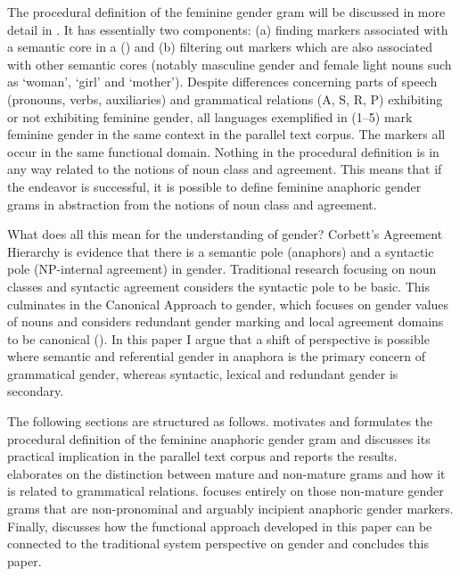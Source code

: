 \documentclass[output=collectionpaper]{langsci/langscibook}
\begin{document}
The procedural definition of the feminine gender gram will be discussed in more detail in . It has essentially two components: (a) finding markers associated with a semantic core in a  (\citealt{Givon1981}) and (b) filtering out markers which are also associated with other semantic cores (notably masculine gender and female light nouns such as ‘woman’, ‘girl’ and ‘mother’). Despite differences concerning parts of speech (pronouns, verbs, auxiliaries) and grammatical relations (A, S, R, P) exhibiting or not exhibiting feminine gender, all languages exemplified in (1--5) mark feminine gender in the same context in the parallel text corpus. The markers all occur in the same functional domain. Nothing in the procedural definition is in any way related to the notions of noun class and agreement. This means that if the endeavor is successful, it is possible to define feminine anaphoric gender grams in abstraction from the notions of noun class and agreement.

\largerpage[2]
What does all this mean for the understanding of gender? Corbett’s Agreement Hierarchy is evidence that there is a semantic pole (anaphors) and a syntactic pole (NP-internal agreement) in gender. Traditional research focusing on noun classes and syntactic agreement considers the syntactic pole to be basic. This culminates in the Canonical Approach to gender, which focuses on gender values of nouns and considers redundant gender marking and local agreement domains to be canonical (\citealt{Corbett2016}). In this paper I argue that a shift of perspective is possible where semantic and referential gender in anaphora is the primary concern of grammatical gender, whereas syntactic, lexical and redundant gender is secondary.

The following sections are structured as follows.  motivates and formulates the procedural definition of the feminine anaphoric gender gram and  discusses its practical implication in the parallel text corpus and reports the results.  elaborates on the distinction between mature and non-mature grams and how it is related to grammatical relations.  focuses entirely on those non-mature gender grams that are non-pronominal and arguably incipient anaphoric gender markers. Finally,  discusses how the functional approach developed in this paper can be connected to the traditional system perspective on gender and  concludes this paper.
\end{document}
